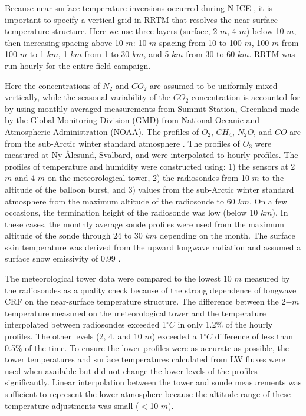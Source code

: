 Because near-surface temperature inversions occurred during N-ICE \citep{kayser:2017}, it is important to specify a vertical grid in RRTM that resolves the near-surface temperature structure. Here we use three layers (surface, 2 $m$, 4 $m$) below 10 $m$, then increasing spacing above 10 $m$: 10 $m$ spacing from 10 to 100 $m$, 100 $m$ from 100 $m$ to 1 $km$, 1 $km$ from 1 to 30 $km$, and 5 $km$ from 30 to 60 $km$. RRTM was run hourly for the entire field campaign.

Here the concentrations of $N_{2}$ and $CO_{2}$ are assumed to be uniformly mixed vertically, while the seasonal variability of the $CO_{2}$ concentration is accounted for by using monthly averaged measurements from Summit Station, Greenland made by the Global Monitoring Division (GMD) from National Oceanic and Atmospheric Administration (NOAA). The profiles of $O_{2}$, $CH_{4}$, $N_{2}O$, and $CO$ are from the sub-Arctic winter standard atmosphere \citep{mcclatchey:1972}. The profiles of $O_{3}$ were measured at Ny-\r{A}lesund, Svalbard, and were interpolated to hourly profiles. The profiles of temperature and humidity were constructed using: 1) the sensors at 2 $m$ and 4 $m$ on the meteorological tower, 2) the radiosondes from 10 $m$ to the altitude of the balloon burst, and 3) values from the sub-Arctic winter standard atmosphere from the maximum altitude of the radiosonde to 60 $km$. On a few occasions, the termination height of the radiosonde was low (below 10 $km$). In these cases, the monthly average sonde profiles were used from the maximum altitude of the sonde through 24 to 30 $km$ depending on the month. The surface skin temperature was derived from the upward longwave radiation \citep{walden:2017} and assumed a surface snow emissivity of 0.99 \citep{persson:2002, grenfell:1999}.

The meteorological tower data were compared to the lowest 10 $m$ measured by the radiosondes as a quality check because of the strong dependence of longwave CRF on the near-surface temperature structure. The difference between the 2$-m$ temperature measured on the meteorological tower and the temperature interpolated between radiosondes exceeded 1$^{\circ}C$ in only 1.2$\%$ of the hourly profiles. The other levels (2, 4, and 10 $m$) exceeded a 1$^{\circ}C$ difference of less than 0.5$\%$ of the time. To ensure the lower profiles were as accurate as possible, the tower temperatures and surface temperatures calculated from LW fluxes were used when available but did not change the lower levels of the profiles significantly. Linear interpolation between the tower and sonde measurements was sufficient to represent the lower atmosphere because the altitude range of these temperature adjustments was small ($<$10 $m$).

